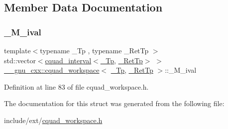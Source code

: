 \subsection{Member Data Documentation}
\mbox{\label{struct____gnu__cxx_1_1cquad__workspace_a46edeb05c52f2a406dc582b404fe83e6}} 
\subsubsection{\texorpdfstring{\+\_\+\+M\+\_\+ival}{\_M\_ival}}
{\footnotesize\ttfamily template$<$typename \+\_\+\+Tp , typename \+\_\+\+Ret\+Tp $>$ \\
std\+::vector$<$\hyperlink{struct____gnu__cxx_1_1cquad__interval}{cquad\+\_\+interval}$<$\hyperlink{namespace____gnu__cxx_a3b19a9c800ca194374ef9172290f7d79}{\+\_\+\+Tp}, \hyperlink{namespace____gnu__cxx_a886e03ece3d53ff7fa6c098a40f93fa5}{\+\_\+\+Ret\+Tp}$>$ $>$ \hyperlink{struct____gnu__cxx_1_1cquad__workspace}{\+\_\+\+\_\+gnu\+\_\+cxx\+::cquad\+\_\+workspace}$<$ \hyperlink{namespace____gnu__cxx_a3b19a9c800ca194374ef9172290f7d79}{\+\_\+\+Tp}, \hyperlink{namespace____gnu__cxx_a886e03ece3d53ff7fa6c098a40f93fa5}{\+\_\+\+Ret\+Tp} $>$\+::\+\_\+\+M\+\_\+ival}



Definition at line 83 of file cquad\+\_\+workspace.\+h.



The documentation for this struct was generated from the following file\+:\begin{DoxyCompactItemize}
\item 
include/ext/\hyperlink{cquad__workspace_8h}{cquad\+\_\+workspace.\+h}\end{DoxyCompactItemize}
